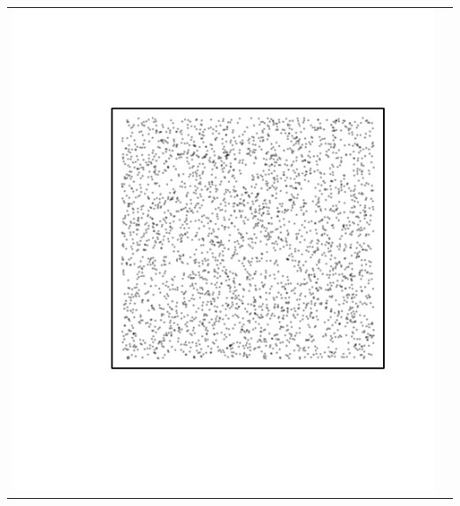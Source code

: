 \documentclass{article}\usepackage{graphicx, color}
\makeatletter
\def\maxwidth{ %
  \ifdim\Gin@nat@width>\linewidth
    \linewidth
  \else
    \Gin@nat@width
  \fi
}
\newenvironment{knitrout}{}{} %
\makeatother
\begin{document}
\vspace*{-1.75in}
\begin{tabular}{cc}
\begin{knitrout}
\definecolor{shadecolor}{rgb}{0.969, 0.969, 0.969}\color{fgcolor}\includegraphics[width=\maxwidth]{figure/unnamed-chunk-7} 
\end{knitrout}


\end{tabular}
\end{document}
